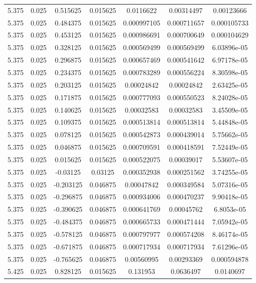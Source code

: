 \begin{flushleft}
\begin{longtable}{ccccccc}
5.375 & 0.025 & 0.515625 & 0.015625 & 0.0116622 & 0.00314497 & 0.00123666  \\ 
5.375 & 0.025 & 0.484375 & 0.015625 & 0.000997105 & 0.000711657 & 0.000105733  \\ 
5.375 & 0.025 & 0.453125 & 0.015625 & 0.000986691 & 0.000700649 & 0.000104629  \\ 
5.375 & 0.025 & 0.328125 & 0.015625 & 0.000569499 & 0.000569499 & 6.03896e-05  \\ 
5.375 & 0.025 & 0.296875 & 0.015625 & 0.000657469 & 0.000541642 & 6.97178e-05  \\ 
5.375 & 0.025 & 0.234375 & 0.015625 & 0.000783289 & 0.000556224 & 8.30598e-05  \\ 
5.375 & 0.025 & 0.203125 & 0.015625 & 0.00024842 & 0.00024842 & 2.63425e-05  \\ 
5.375 & 0.025 & 0.171875 & 0.015625 & 0.000777093 & 0.000550523 & 8.24028e-05  \\ 
5.375 & 0.025 & 0.140625 & 0.015625 & 0.00032583 & 0.00032583 & 3.45509e-05  \\ 
5.375 & 0.025 & 0.109375 & 0.015625 & 0.000513814 & 0.000513814 & 5.44848e-05  \\ 
5.375 & 0.025 & 0.078125 & 0.015625 & 0.000542873 & 0.000439014 & 5.75662e-05  \\ 
5.375 & 0.025 & 0.046875 & 0.015625 & 0.000709591 & 0.000418591 & 7.52449e-05  \\ 
5.375 & 0.025 & 0.015625 & 0.015625 & 0.000522075 & 0.00039017 & 5.53607e-05  \\ 
5.375 & 0.025 & -0.03125 & 0.03125 & 0.000352938 & 0.000251562 & 3.74255e-05  \\ 
5.375 & 0.025 & -0.203125 & 0.046875 & 0.00047842 & 0.000349584 & 5.07316e-05  \\ 
5.375 & 0.025 & -0.296875 & 0.046875 & 0.000934006 & 0.000470237 & 9.90418e-05  \\ 
5.375 & 0.025 & -0.390625 & 0.046875 & 0.000641769 & 0.00045762 & 6.8053e-05  \\ 
5.375 & 0.025 & -0.484375 & 0.046875 & 0.000665733 & 0.000471444 & 7.05942e-05  \\ 
5.375 & 0.025 & -0.578125 & 0.046875 & 0.000797977 & 0.000574208 & 8.46174e-05  \\ 
5.375 & 0.025 & -0.671875 & 0.046875 & 0.000717934 & 0.000717934 & 7.61296e-05  \\ 
5.375 & 0.025 & -0.765625 & 0.046875 & 0.00560995 & 0.00293369 & 0.000594878  \\ 
5.425 & 0.025 & 0.828125 & 0.015625 & 0.131953 & 0.0636497 & 0.0140697  \\ 

\end{longtable}
\end{flushleft}
